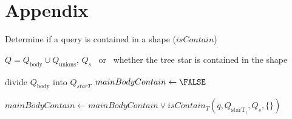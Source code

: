\section*{Appendix}






\begin{algorithm}
    \caption{Determine if a query is contained in a shape ($isContain$)}\label{alg:containment}
    \begin{algorithmic}
       \REQUIRE  $Q = Q_{\text{body}} \cup Q_{\text{unions}}$, $Q_s$
       \ENSURE \TRUE\ or \FALSE\ whether the tree star is contained in the shape
       
       \STATE divide $Q_{\text{body}}$ into $Q_{starT}$
       \STATE $mainBodyContain \gets \FALSE$
 
             \STATE $mainBodyContain \gets mainBodyContain \lor isContain_{T}(q, Q_{\text{starT}_i}, Q_s, \{\})$
          \ENDFOR
       \ENDFOR
 
                \RETURN \FALSE
             \ENDIF
          \ENDFOR
       \ELSE
          \RETURN \FALSE
       \ENDIF
       \RETURN \TRUE
    \end{algorithmic}
 \end{algorithm}